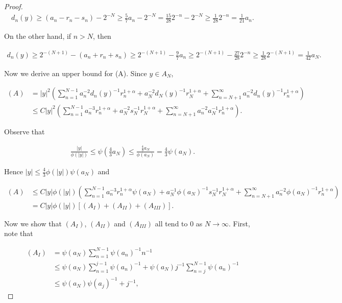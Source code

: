 \documentclass{article}
\theoremstyle{definition}
\begin{document}
\begin{proof}
\begin{align*}
    d_n(y) \geq (a_n -r_n -s_n) - 2^{-N} \geq \frac{5}{7} a_n - 2^{-N} = \frac{15}{28} 2^{-n} -2^{-N} \geq \frac{1}{28} 2^{-n} = \frac{1}{21} a_n.
\end{align*}

\noindent On the other hand, if $n > N$, then

\begin{align*}
    d_n(y) \geq 2^{-(N+1)} - (a_n + r_n + s_n) \geq 2^{-(N+1)} - \frac{9}{7} a_n \geq 2^{-(N+1)} - \frac{27}{28} 2^{-n} \geq \frac{1}{28} 2^{-(N+1)} = \frac{1}{42} a_N.
\end{align*}



Now we derive an upper bound for (A). Since $y \in A_N$, 

\begin{align*}
    (A) &= |y|^2\left(\sum_{n=1}^{N-1}  a_n^{-2} d_n(y)^{-1} r_n^{1+\alpha} + a_N^{-2} d_N(y)^{-1} r_N^{1+\alpha} + \sum_{n=N+1}^{\infty}  a_n^{-2} d_n(y)^{-1} r_n^{1+\alpha}\right)\\
    &\leq C|y|^2 \left( \sum_{n=1}^{N-1}  a_n^{-3}  r_n^{1+\alpha} + a_N^{-2} s_N^{-1} r_N^{1+\alpha} + \sum_{n=N+1}^{\infty}  a_n^{-2} a_N^{-1} r_n^{1+\alpha} \right).
\end{align*}


\noindent Observe that 

\begin{align*}
    \frac{|y|}{\phi(|y|)} \leq \psi\left(\frac{4}{3}a_N\right) \leq \frac{\frac{4}{3}a_N}{\phi(a_N)} = \frac{4}{3} \psi(a_N).
\end{align*}

\noindent Hence $|y| \leq \frac{4}{3} \phi(|y|) \psi(a_N)$ and

\begin{align*}
    (A) &\leq C|y|\phi(|y|) \left( \sum_{n=1}^{N-1}  a_n^{-3}  r_n^{1+\alpha} \psi(a_N) + a_N^{-1} \phi(a_N)^{-1} s_N^{-1} r_N^{1+\alpha} + \sum_{n=N+1}^{\infty}  a_n^{-2} \phi(a_N)^{-1} r_n^{1+\alpha} \right)\\
    &= C|y|\phi(|y|) \left[ (A_I) + (A_{II}) + (A_{III}) \right].
\end{align*}



Now we show that $(A_I)$, $(A_{II})$ and $(A_{III})$ all tend to $0$ as $N \to \infty$. First, note that

\begin{align*}
    (A_I) &= \psi(a_N) \sum_{n=1}^{N-1}  \psi(a_n)^{-1} n^{-1}\\
    &\leq \psi(a_N) \sum_{n=1}^{j-1}  \psi(a_n)^{-1} + \psi(a_N) j^{-1} \sum_{n=j}^{N-1}  \psi(a_n)^{-1} \\
    &\leq \psi(a_N) \psi(a_j)^{-1} + j^{-1},
\end{align*}



\end{proof}
\end{document}
